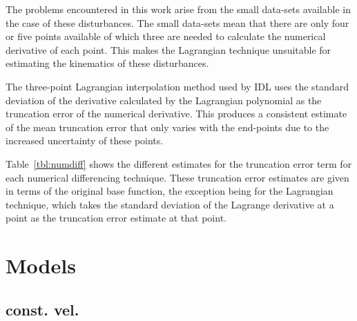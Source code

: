 \documentclass[namedreferences]{SolarPhysics}
\begin{document}
\begin{article}
 The problems encountered in this work arise from the small data-sets available in the case of these disturbances. The small data-sets mean that there are only four or five points available of which three are needed to calculate the numerical derivative of each point. This makes the Lagrangian technique unsuitable for estimating the kinematics of these disturbances.

The three-point Lagrangian interpolation method used by IDL uses the standard deviation of the derivative calculated by the Lagrangian polynomial as the truncation error of the numerical derivative. This produces a consistent estimate of the mean truncation error that only varies with the end-points due to the increased uncertainty of these points.

Table~\ref{tbl:numdiff} shows the different estimates for the truncation error term for each numerical differencing technique. These truncation error estimates are given in terms of the original base function, the exception being for the Lagrangian technique, which takes the standard deviation of the Lagrange derivative at a point as the truncation error estimate at that point.





    
\section{Models} %
      \label{S-features}      

\subsection{const. vel.}


\end{article}
\end{document}
